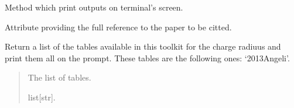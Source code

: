 \documentclass[letterpaper,10pt,english]{sphinxmanual}
\begin{document}
\begin{fulllineitems}
\begin{fulllineitems}
\end{fulllineitems}


\begin{fulllineitems}
\label{\detokenize{source/api/setup_nuc_rch_exp:nucleardatapy.setup_nuc_rch_exp.SetupNucRchExp.print_outputs}}
\pysigstartsignatures
\pysiglinewithargsret
{}
{}
{}
\pysigstopsignatures
\sphinxAtStartPar
Method which print outputs on terminal’s screen.

\end{fulllineitems}


\begin{fulllineitems}
\label{\detokenize{source/api/setup_nuc_rch_exp:nucleardatapy.setup_nuc_rch_exp.SetupNucRchExp.ref}}
\pysigstartsignatures
\pysigline
{}
\pysigstopsignatures
\sphinxAtStartPar
Attribute providing the full reference to the paper to be citted.

\end{fulllineitems}


\end{fulllineitems}


\begin{fulllineitems}
\label{\detokenize{source/api/setup_nuc_rch_exp:nucleardatapy.setup_nuc_rch_exp.nuc_rch_exp_tables}}
\pysigstartsignatures
\pysiglinewithargsret
{}
{}
{}
\pysigstopsignatures
\sphinxAtStartPar
Return a list of the tables available in this toolkit for the charge radiuus and
print them all on the prompt.  These tables are the following
ones: ‘2013\sphinxhyphen{}Angeli’.
\begin{quote}\begin{description}
\sphinxAtStartPar
The list of tables.

\sphinxAtStartPar
list{[}str{]}.

\end{description}\end{quote}

\end{fulllineitems}
\end{document}
